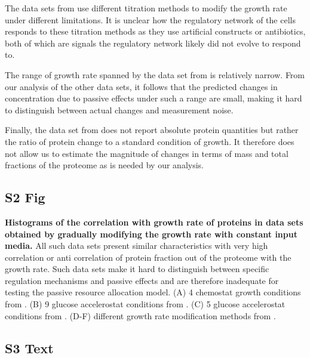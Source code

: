 \documentclass[10pt,letterpaper]{article}
\begin{document}
The data sets from \cite{Hui_2015} use different titration methods to modify the growth rate under different limitations.
It is unclear how the regulatory network of the cells responds to these titration methods as they use artificial constructs or antibiotics, both of which are signals the regulatory network likely did not evolve to respond to.

The range of growth rate spanned by the data set from \cite{Hui_2015} is relatively narrow.
From our analysis of the other data sets, it follows that the predicted changes in concentration due to passive effects under such a range are small, making it hard to distinguish between actual changes and measurement noise.

Finally, the data set from \cite{Hui_2015} does not report absolute protein quantities but rather the ratio of protein change to a standard condition of growth.
It therefore does not allow us to estimate the magnitude of changes in terms of mass and total fractions of the proteome as is needed by our analysis.

\subsection*{S2 Fig}
\label{fig:grcorr_dbs}
    {\bf Histograms of the correlation with growth rate of proteins in data sets obtained by gradually modifying the growth rate with constant input media.}
All such data sets present similar characteristics with very high correlation or anti correlation of protein fraction out of the proteome with the growth rate.
Such data sets make it hard to distinguish between specific regulation mechanisms and passive effects and are therefore inadequate for testing the passive resource allocation model.
(A) 4 chemostat growth conditions from \cite{Schmidt2015}.
(B) 9 glucose accelerostat conditions from \cite{Peebo_2015}.
(C) 5 glucose accelerostat conditions from \cite{Valgepea2013}.
(D-F) different growth rate modification methods from \cite{Hui_2015}.


\subsection*{S3 Text}
\label{dbscorr}
\end{document}
